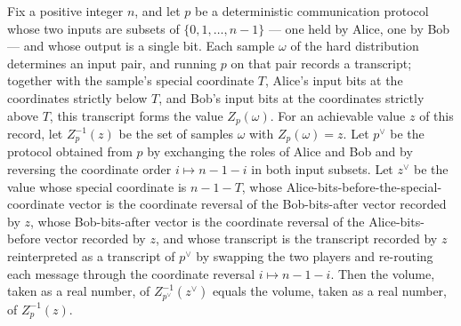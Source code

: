 \begin{theorem}
\label{CommunicationComplexity.Functions.Disjointness.RandomizedLowerBound.volume_measureReal_zVariable_dualProtocol_dualZValue}
\leanok
{}
Fix a positive integer $n$, and let $p$ be a deterministic communication protocol whose
two inputs are subsets of $\{0,1,\dots,n-1\}$ — one held by Alice, one by Bob — and
whose output is a single bit. Each sample $\omega$ of the hard distribution determines
an input pair, and running $p$ on that pair records a transcript; together with the
sample's special coordinate $T$, Alice's input bits at the coordinates strictly below
$T$, and Bob's input bits at the coordinates strictly above $T$, this transcript forms
the value $Z_p(\omega)$. For an achievable value $z$ of this record, let $Z_p^{-1}(z)$
be the set of samples $\omega$ with $Z_p(\omega)=z$. Let $p^{\vee}$ be the protocol
obtained from $p$ by exchanging the roles of Alice and Bob and by reversing the
coordinate order $i \mapsto n-1-i$ in both input subsets. Let $z^{\vee}$ be the value
whose special coordinate is $n-1-T$, whose Alice-bits-before-the-special-coordinate
vector is the coordinate reversal of the Bob-bits-after vector recorded by $z$, whose
Bob-bits-after vector is the coordinate reversal of the Alice-bits-before vector
recorded by $z$, and whose transcript is the transcript recorded by $z$ reinterpreted as
a transcript of $p^{\vee}$ by swapping the two players and re-routing each message
through the coordinate reversal $i \mapsto n-1-i$. Then the volume, taken as a real
number, of $Z_{p^{\vee}}^{-1}(z^{\vee})$ equals the volume, taken as a real number, of
$Z_p^{-1}(z)$.
\end{theorem}

